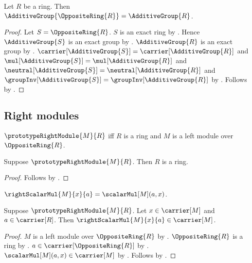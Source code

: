 \begin{theorem}\label{spike_opposite_ring_additive_reduct}
    Let $R$ be a ring.
    Then $\AdditiveGroup{\OppositeRing{R}}=\AdditiveGroup{R}$.
\end{theorem}
\begin{proof}
    Let $S=\OppositeRing{R}$.
    $S$ is an exact ring by .
    Hence $\AdditiveGroup{S}$ is an exact group by
        .
    $\AdditiveGroup{R}$ is an exact group by
        .
    $\carrier[\AdditiveGroup{S}]=\carrier[\AdditiveGroup{R}]$ and
        $\mul[\AdditiveGroup{S}]=\mul[\AdditiveGroup{R}]$ and
        $\neutral[\AdditiveGroup{S}]=\neutral[\AdditiveGroup{R}]$ and
        $\groupInv[\AdditiveGroup{S}]=\groupInv[\AdditiveGroup{R}]$ by
        .
    Follows by .
\end{proof}

\subsection{Right modules}

\begin{definition}\label{spike_prototype_right_module}
    $\prototypeRightModule{M}{R}$ iff
        $R$ is a ring and
        $M$ is a left module over $\OppositeRing{R}$.
\end{definition}

\begin{proposition}\label{spike_right_module_ring_guard}
    Suppose $\prototypeRightModule{M}{R}$.
    Then $R$ is a ring.
\end{proposition}
\begin{proof}
    Follows by .
\end{proof}

\begin{definition}\label{spike_right_scalar_multiplication}
    $\rightScalarMul{M}{x}{a}=\scalarMul[M](a,x)$.
\end{definition}

\begin{proposition}\label{spike_right_scalar_type}
    Suppose $\prototypeRightModule{M}{R}$.
    Let $x\in\carrier[M]$ and $a\in\carrier[R]$.
    Then $\rightScalarMul{M}{x}{a}\in\carrier[M]$.
\end{proposition}
\begin{proof}
    $M$ is a left module over $\OppositeRing{R}$ by
        .
    $\OppositeRing{R}$ is a ring by .
    $a\in\carrier[\OppositeRing{R}]$ by
        .
    $\scalarMul[M](a,x)\in\carrier[M]$ by
        .
    Follows by .
\end{proof}

